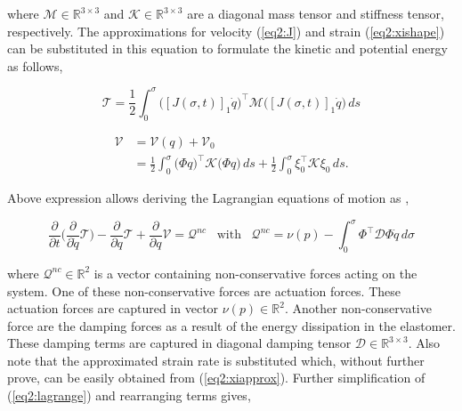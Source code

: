 where $\mathcal{M} \in \mathbb{R}^{3\times3}$ and $\mathcal{K} \in \mathbb{R}^{3\times3}$ are a diagonal mass tensor and stiffness tensor, respectively. The approximations for velocity (\ref{eq2:J}) and strain (\ref{eq2:xishape}) can be substituted in this equation to formulate the kinetic and potential energy as follows,

\begin{equation}
    \mathcal{T} = \frac{1}{2}\int_0^{\sigma} \Big([J(\sigma,t)]_1\dot{q}\Big)^\top \mathcal{M} \Big([J(\sigma,t)]_1\dot{q}\Big) \hspace{2pt} ds
\end{equation}

\begin{equation}
\begin{split}
    \mathcal{V} &= \mathcal{V}(q) + \mathcal{V}_0  \\
                &=  \frac{1}{2}\int_0^{\sigma} \big(\Phi q\big)^\top \mathcal{K} \big(\Phi q\big) \hspace{2pt} ds +\frac{1}{2} \int_0^\sigma \xi_0^\top \mathcal{K} \xi_0  \hspace{2pt} ds .
\end{split}
\end{equation}

Above expression allows deriving the Lagrangian equations of motion as \cite{NWouw},

\begin{equation}
    \frac{\partial}{\partial t}\Big( \frac{\partial}{\partial\dot{q}}\mathcal{T}\Big)- \frac{\partial}{\partial q}\mathcal{T} + \frac{\partial}{\partial q}\mathcal{V} = \mathcal{Q}^{nc} \hspace{10pt} \text{with} \hspace{10pt} \mathcal{Q}^{nc} =  \nu(p) - \int_0^\sigma \Phi^\top \mathcal{D} \Phi \dot{q} \hspace{2pt} d \sigma
    \label{eq2:lagrange}
\end{equation}

where $\mathcal{Q}^{nc} \in \mathbb{R}^2$ is a vector containing non-conservative forces acting on the system. One of these non-conservative forces are actuation forces. These actuation forces are captured in vector $\nu(p) \in \mathbb{R}^2$. Another non-conservative force are the damping forces as a result of the energy dissipation in the elastomer. These damping terms are captured in diagonal damping tensor $\mathcal{D} \in \mathbb{R}^{3 \times 3}$. Also note that the approximated strain rate is substituted which, without further prove, can be easily obtained from (\ref{eq2:xiapprox}). Further simplification of (\ref{eq2:lagrange}) and rearranging terms gives,


